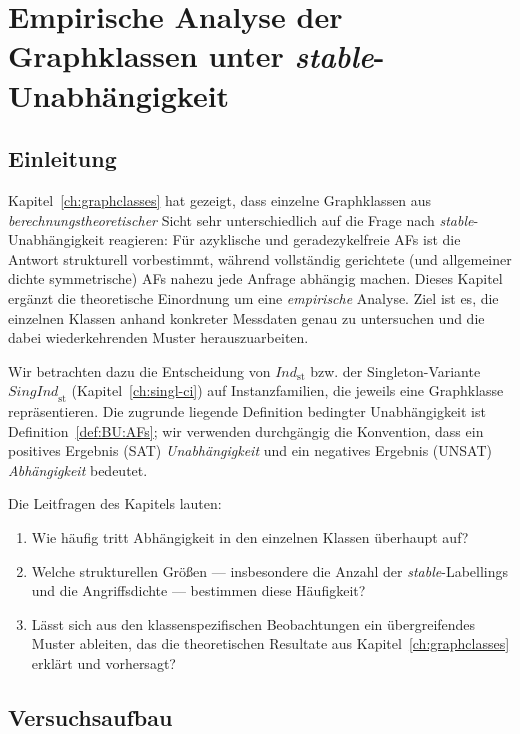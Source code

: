 \chapter{Empirische Analyse der Graphklassen unter \textit{stable}-Unabh\"angigkeit}
\label{ch:graphclasses-empirical}

\section{Einleitung}
\label{sec:gce-einleitung}

Kapitel~\ref{ch:graphclasses} hat gezeigt, dass einzelne Graphklassen aus
\emph{berechnungstheoretischer} Sicht sehr unterschiedlich auf die Frage nach
\textit{stable}-Unabh\"angigkeit reagieren: F\"ur azyklische und
geradezykelfreie AFs ist die Antwort strukturell vorbestimmt, w\"ahrend
vollst\"andig gerichtete (und allgemeiner dichte symmetrische) AFs nahezu jede
Anfrage abh\"angig machen. Dieses Kapitel erg\"anzt die theoretische
Einordnung um eine \emph{empirische} Analyse. Ziel ist es, die einzelnen
Klassen anhand konkreter Messdaten genau zu untersuchen und die dabei
wiederkehrenden Muster herauszuarbeiten.

Wir betrachten dazu die Entscheidung von
\(\textit{Ind}_{\mathrm{st}}\) bzw. der Singleton-Variante
\(\textit{SingInd}_{\mathrm{st}}\) (Kapitel~\ref{ch:singl-ci}) auf
Instanzfamilien, die jeweils eine Graphklasse repr\"asentieren. Die zugrunde
liegende Definition bedingter Unabh\"angigkeit ist
Definition~\ref{def:BU:AFs}; wir verwenden durchg\"angig die Konvention, dass
ein positives Ergebnis (SAT) \emph{Unabh\"angigkeit} und ein negatives Ergebnis
(UNSAT) \emph{Abh\"angigkeit} bedeutet.

Die Leitfragen des Kapitels lauten:
\begin{enumerate}
    \item Wie h\"aufig tritt Abh\"angigkeit in den einzelnen Klassen \"uberhaupt
    auf?
    \item Welche strukturellen Gr\"o\ss en --- insbesondere die Anzahl der
    \textit{stable}-Labellings und die Angriffsdichte --- bestimmen diese
    H\"aufigkeit?
    \item L\"asst sich aus den klassenspezifischen Beobachtungen ein
    \"ubergreifendes Muster ableiten, das die theoretischen Resultate aus
    Kapitel~\ref{ch:graphclasses} erkl\"art und vorhersagt?
\end{enumerate}

\section{Versuchsaufbau}
\label{sec:gce-aufbau}

